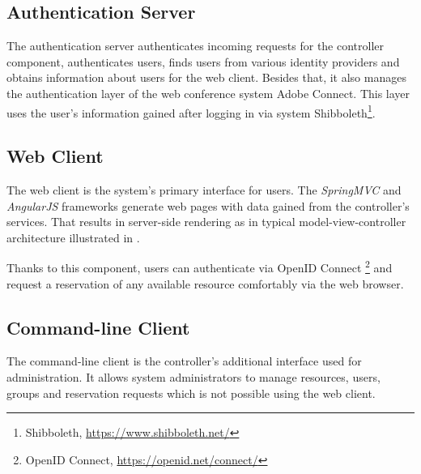 \subsection{Authentication Server}
The authentication server authenticates incoming requests for the controller component, authenticates users, finds users from various identity providers and obtains information about users for the web client.
Besides that, it also manages the authentication layer of the web conference system Adobe Connect. This layer uses the user's information gained after logging in via system Shibboleth\footnote{Shibboleth, \url{https://www.shibboleth.net/}}.

\subsection{Web Client} \label{webclient}
The web client is the system's primary interface for users. The \emph{SpringMVC} and \emph{AngularJS} frameworks generate web pages with data gained from the controller’s services. That results in server-side rendering as in typical model-view-controller architecture illustrated in .


Thanks to this component, users can authenticate via OpenID Connect \footnote{OpenID Connect, \url{https://openid.net/connect/}} and request a reservation of any available resource comfortably via the web browser.

\subsection{Command-line Client}
The command-line client is the controller's additional interface used for administration. It allows system administrators to manage resources, users, groups and reservation requests which is not possible using the web client.

